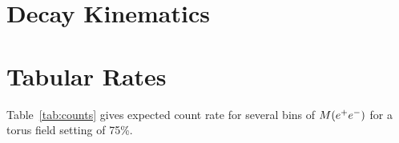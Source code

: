 \section{Decay Kinematics}\label{sec:app.kinematics}



\section{Tabular Rates}\label{sec:app.rates}
Table~\ref{tab:counts} gives expected count rate for several bins of $M(e^+e^-)$ for a torus field setting of 75\%.

%
%
